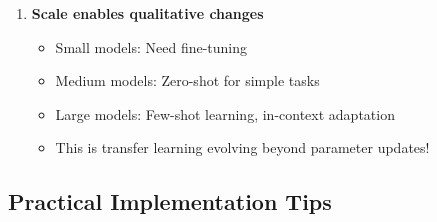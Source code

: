 \documentclass{article}
\begin{document}
\begin{tcolorbox}[colback=green!5!white, colframe=green!50!black, title=Core Principles of SSL Objectives]
\begin{enumerate}
\item \textbf{Scale enables qualitative changes}
\begin{itemize}
\item Small models: Need fine-tuning
\item Medium models: Zero-shot for simple tasks
\item Large models: Few-shot learning, in-context adaptation
\item This is transfer learning evolving beyond parameter updates!
\end{itemize}
\end{enumerate}
\end{tcolorbox}

\subsection{Practical Implementation Tips}
\end{document}
